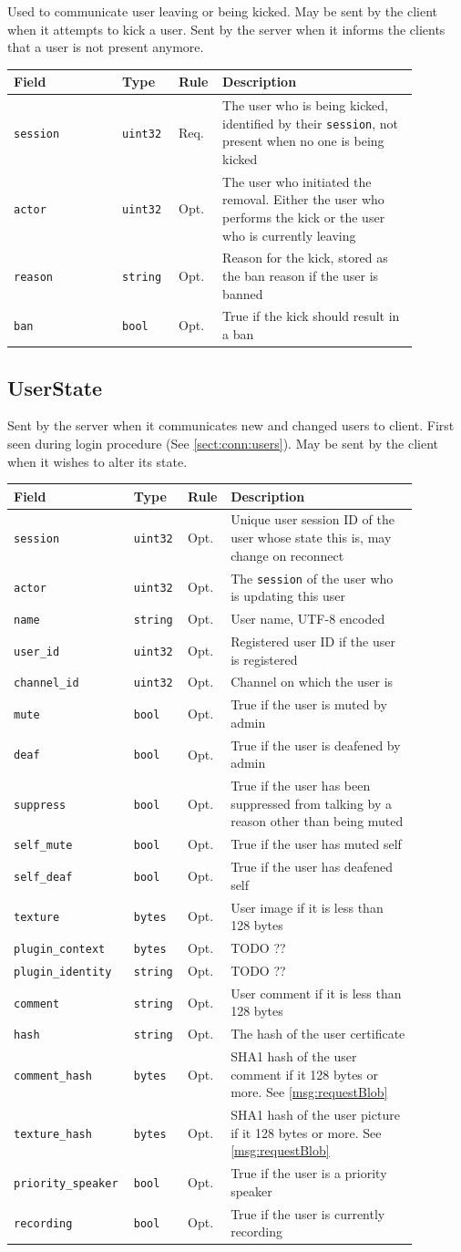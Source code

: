 \documentclass[11pt]{article} %
\newenvironment{mumbleMessageEx}
{%
	\small
	\renewcommand\arraystretch{1.5}
	\begin{tabular}{p{0.25\linewidth}p{0.13\linewidth}p{0.05\linewidth}p{0.45\linewidth}}
	Field & Type & Rule & Description \\
	\hline
}
{%
	\end{tabular}
	\renewcommand\arraystretch{1.0}
}
\newcommand{\mumbleMessageExItem}[4]{ \texttt{#1} & \texttt{#2} & #3 & #4 \\ }
\begin{document}
Used to communicate user leaving or being kicked. May be sent by the client when it attempts to kick a user. Sent by the server when it informs the clients that a user is not present anymore.

\begin{mumbleMessageEx}
\mumbleMessageExItem{session}{uint32}{Req.}{The user who is being kicked, identified by their \texttt{session}, not present when no one is being kicked}
\mumbleMessageExItem{actor}{uint32}{Opt.}{The user who initiated the removal. Either the user who performs the kick or the user who is currently leaving}
\mumbleMessageExItem{reason}{string}{Opt.}{Reason for the kick, stored as the ban reason if the user is banned}
\mumbleMessageExItem{ban}{bool}{Opt.}{True if the kick should result in a ban}
\end{mumbleMessageEx}

\subsection{UserState}
\label{msg:userState}

Sent by the server when it communicates new and changed users to client. First seen during login procedure (See \ref{sect:conn:users}). May be sent by the client when it wishes to alter its state.

\begin{mumbleMessageEx}
\mumbleMessageExItem{session}{uint32}{Opt.}{Unique user session ID of the user whose state this is, may change on reconnect}
\mumbleMessageExItem{actor}{uint32}{Opt.}{The \texttt{session} of the user who is updating this user}
\mumbleMessageExItem{name}{string}{Opt.}{User name, UTF-8 encoded}
\mumbleMessageExItem{user\_id}{uint32}{Opt.}{Registered user ID if the user is registered}
\mumbleMessageExItem{channel\_id}{uint32}{Opt.}{Channel on which the user is}
\mumbleMessageExItem{mute}{bool}{Opt.}{True if the user is muted by admin}
\mumbleMessageExItem{deaf}{bool}{Opt.}{True if the user is deafened by admin}
\mumbleMessageExItem{suppress}{bool}{Opt.}{True if the user has been suppressed from talking by a reason other than being muted}
\mumbleMessageExItem{self\_mute}{bool}{Opt.}{True if the user has muted self}
\mumbleMessageExItem{self\_deaf}{bool}{Opt.}{True if the user has deafened self}
\mumbleMessageExItem{texture}{bytes}{Opt.}{User image if it is less than 128 bytes}
\mumbleMessageExItem{plugin\_context}{bytes}{Opt.}{TODO ??}
\mumbleMessageExItem{plugin\_identity}{string}{Opt.}{TODO ??}
\mumbleMessageExItem{comment}{string}{Opt.}{User comment if it is less than 128 bytes}
\mumbleMessageExItem{hash}{string}{Opt.}{The hash of the user certificate}
\mumbleMessageExItem{comment\_hash}{bytes}{Opt.}{SHA1 hash of the user comment if it 128 bytes or more. See \ref{msg:requestBlob}}
\mumbleMessageExItem{texture\_hash}{bytes}{Opt.}{SHA1 hash of the user picture if it 128 bytes or more. See \ref{msg:requestBlob}}
\mumbleMessageExItem{priority\_speaker}{bool}{Opt.}{True if the user is a priority speaker}
\mumbleMessageExItem{recording}{bool}{Opt.}{True if the user is currently recording}
\end{mumbleMessageEx}
\end{document}
